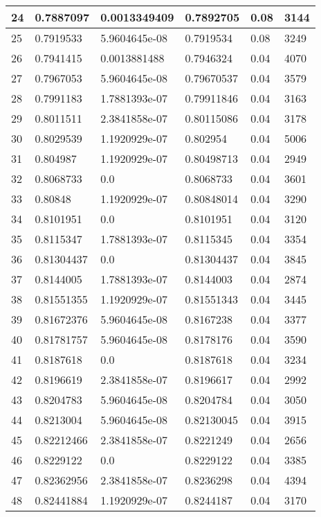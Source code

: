 \begin{longtable}{|l|l|l|l|l|l|}
24 & 0.7887097 & 0.0013349409 & 0.7892705 & 0.08 & 3144 \\ \hline 
25 & 0.7919533 & 5.9604645e-08 & 0.7919534 & 0.08 & 3249 \\ \hline 
26 & 0.7941415 & 0.0013881488 & 0.7946324 & 0.04 & 4070 \\ \hline 
27 & 0.7967053 & 5.9604645e-08 & 0.79670537 & 0.04 & 3579 \\ \hline 
28 & 0.7991183 & 1.7881393e-07 & 0.79911846 & 0.04 & 3163 \\ \hline 
29 & 0.8011511 & 2.3841858e-07 & 0.80115086 & 0.04 & 3178 \\ \hline 
30 & 0.8029539 & 1.1920929e-07 & 0.802954 & 0.04 & 5006 \\ \hline 
31 & 0.804987 & 1.1920929e-07 & 0.80498713 & 0.04 & 2949 \\ \hline 
32 & 0.8068733 & 0.0 & 0.8068733 & 0.04 & 3601 \\ \hline 
33 & 0.80848 & 1.1920929e-07 & 0.80848014 & 0.04 & 3290 \\ \hline 
34 & 0.8101951 & 0.0 & 0.8101951 & 0.04 & 3120 \\ \hline 
35 & 0.8115347 & 1.7881393e-07 & 0.8115345 & 0.04 & 3354 \\ \hline 
36 & 0.81304437 & 0.0 & 0.81304437 & 0.04 & 3845 \\ \hline 
37 & 0.8144005 & 1.7881393e-07 & 0.8144003 & 0.04 & 2874 \\ \hline 
38 & 0.81551355 & 1.1920929e-07 & 0.81551343 & 0.04 & 3445 \\ \hline 
39 & 0.81672376 & 5.9604645e-08 & 0.8167238 & 0.04 & 3377 \\ \hline 
40 & 0.81781757 & 5.9604645e-08 & 0.8178176 & 0.04 & 3590 \\ \hline 
41 & 0.8187618 & 0.0 & 0.8187618 & 0.04 & 3234 \\ \hline 
42 & 0.8196619 & 2.3841858e-07 & 0.8196617 & 0.04 & 2992 \\ \hline 
43 & 0.8204783 & 5.9604645e-08 & 0.8204784 & 0.04 & 3050 \\ \hline 
44 & 0.8213004 & 5.9604645e-08 & 0.82130045 & 0.04 & 3915 \\ \hline 
45 & 0.82212466 & 2.3841858e-07 & 0.8221249 & 0.04 & 2656 \\ \hline 
46 & 0.8229122 & 0.0 & 0.8229122 & 0.04 & 3385 \\ \hline 
47 & 0.82362956 & 2.3841858e-07 & 0.8236298 & 0.04 & 4394 \\ \hline 
48 & 0.82441884 & 1.1920929e-07 & 0.8244187 & 0.04 & 3170 \\ \hline 

\end{longtable}
